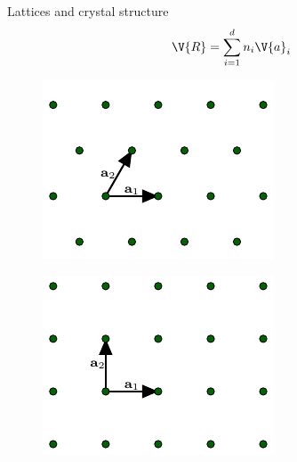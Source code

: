 \documentclass{beamer}
\begin{document}
\begin{frame}{Lattices and crystal structure}
\begin{equation}
\V{R} = \sum_{i = 1}^{d} n_i \V{a}_i
\end{equation}
\begin{figure}[H]
	\centering
	\begin{minipage}{.4\textwidth}
		\centering
		\includegraphics[width=\linewidth]{figures/triangular.pdf}
		\label{fig:test1}
	\end{minipage}%
	\hfill
	\begin{minipage}{.4\textwidth}
		\centering
		\includegraphics[width=\linewidth]{figures/square.pdf}
		\label{fig:test2}
	\end{minipage}
\end{figure}
\end{frame}
\end{document}
